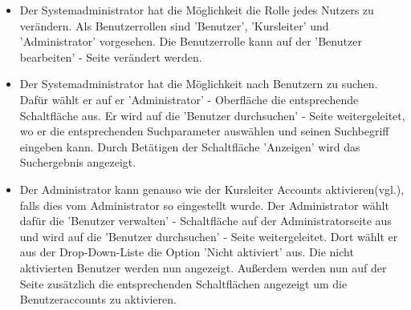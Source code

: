 \documentclass[a4paper]{scrreprt}
\begin{document}
\begin{itemize}
				\item {}
					Der Systemadministrator hat die Möglichkeit die Rolle jedes Nutzers zu verändern. Als Benutzerrollen sind 'Benutzer', 'Kursleiter' und 'Administrator' vorgesehen. Die Benutzerrolle kann auf der 'Benutzer bearbeiten' - Seite verändert werden.
				\item {}
					Der Systemadministrator hat die Möglichkeit nach Benutzern zu suchen. Dafür wählt er auf er 'Administrator' - Oberfläche die entsprechende Schaltfläche aus. Er wird auf die 'Benutzer durchsuchen' - Seite weitergeleitet, wo er die entsprechenden Suchparameter auswählen und seinen Suchbegriff eingeben kann. Durch Betätigen der Schaltfläche 'Anzeigen' wird das Suchergebnis angezeigt.
				\item {}
				    Der Administrator kann genauso wie der Kursleiter Accounts aktivieren(vgl.), falls dies vom Administrator so eingestellt wurde. Der Administrator wählt dafür die 'Benutzer verwalten' - Schaltfläche auf der Administratorseite aus und wird auf die 'Benutzer durchsuchen' - Seite weitergeleitet. Dort wählt er aus der Drop-Down-Liste die Option 'Nicht aktiviert' aus. Die nicht aktivierten Benutzer werden nun angezeigt. Außerdem werden nun auf der Seite zusätzlich die entsprechenden Schaltflächen angezeigt um die Benutzeraccounts zu aktivieren.
			\end{itemize}
\end{document}
